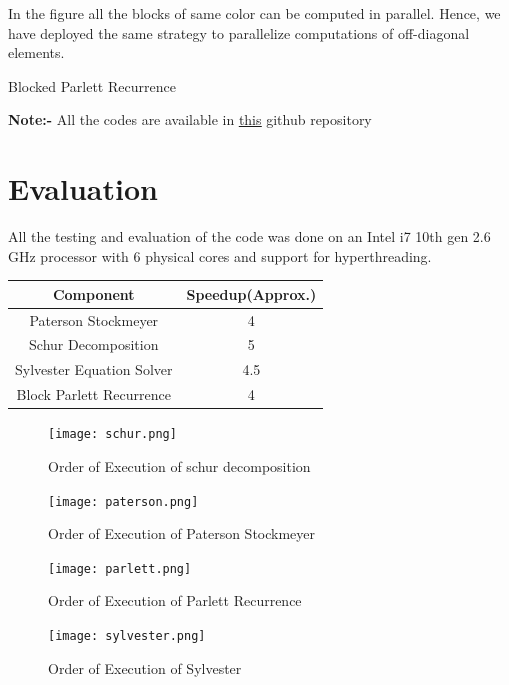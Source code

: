 \documentclass[12pt,a4paper]{article}
\begin{document}
In the figure all the blocks of same color can be computed in parallel. Hence, we have deployed the same strategy to parallelize computations of off-diagonal elements. 

\begin{algorithm}
\caption{Blocked Parlett Recurrence}\label{euclid}
\begin{algorithmic}[1]
    \EndFor
\EndFor
\end{algorithmic}
\end{algorithm}
\textbf{Note:-} All the codes are available in  \href{https://github.com/ChakPC/Matrix_Polynomial_Parallelization}{\underline{this}}  github repository
\newpage
\section{Evaluation}
All the testing and evaluation of the code was done on an Intel i7 10th gen 2.6 GHz processor with 6 physical cores and support for hyperthreading. \\



\begin{center}
\begin{tabular}{|c|c|} 
 \hline
 \textbf{Component} & \textbf{Speedup(Approx.)} \\ [0.5ex] 
 \hline
 Paterson Stockmeyer & 4 \\ 
 \hline
 Schur Decomposition & 5\\
 \hline
 Sylvester Equation Solver & 4.5 \\
 \hline
 Block Parlett Recurrence & 4\\
 \hline
\end{tabular}
\end{center}

\begin{center}
\begin{figure}[H]
    \centering
    \texttt{[image: schur.png]}
    \caption{Order of Execution of schur decomposition}
\end{figure}
\begin{figure}[H]
    \centering
    \texttt{[image: paterson.png]}
    \caption{Order of Execution of Paterson Stockmeyer}
\end{figure}


\begin{figure}[H]
    \centering
    \texttt{[image: parlett.png]}
    \caption{Order of Execution of Parlett Recurrence}
\end{figure}


\begin{figure}[H]
    \centering
    \texttt{[image: sylvester.png]}
    \caption{Order of Execution of Sylvester}
\end{figure}
\end{center}
\end{document}
